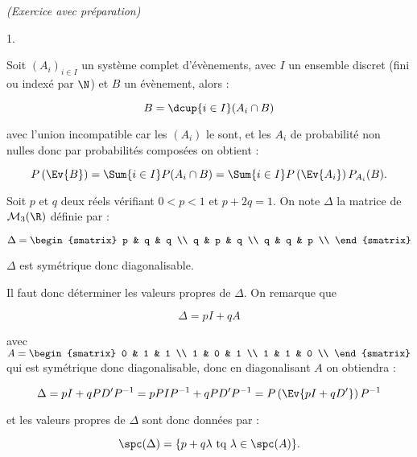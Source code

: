 \documentclass[11pt]{article}%
\begin{document}
 \begin{exercice}{\it (Exercice avec préparation)}~
 \begin{noliste}{1.}
 \setlength{\itemsep}{4mm}
 \item Soit $(A_{i})_{ i \in I }$ un système complet d'évènements, avec
$I$ un ensemble discret (fini ou indexé par $\N$) et $B$ un évènement,
alors : 
 
\[
 B = \dcup{ i \in I } ( A_{i} \cap B ) 
\]

 avec l'union incompatible car les $(A_{i})$ le sont, et les $A_{i}$ de
probabilité non nulles donc par probabilités composées on obtient : 
 
\[
 P \left(\Ev{ B }\right) = \Sum{i \in I} P ( A_{i} \cap B ) = \Sum{ i
\in I } P \left(\Ev{A_{i} }\right) P_{ A_{i} } ( B ). 
\]

 Soit $p$ et $q$ deux réels vérifiant $0<p<1$ et $p + 2q = 1$. On note
$\Delta$ la matrice de $\mathcal{M}_{3} ( \R )$ définie par :
 
\[
 \Delta = \begin{smatrix}
p & q & q \\
q & p & q \\
q & q & p \\
\end{smatrix}
\]

 \item $\Delta$ est symétrique donc diagonalisable. \\

 \item Il faut donc déterminer les valeurs propres de $\Delta$. On
remarque que
 
\[
 \Delta = p I + q A 
\]

 avec $A = \begin{smatrix}
0 & 1 & 1 \\
1 & 0 & 1 \\
1 & 1 & 0 \\
\end{smatrix}
$ qui est symétrique donc diagonalisable, donc en diagonalisant $A$ on
obtiendra : 
 
\[
 \Delta = p I + q P D' P^{-1} = p P I P^{-1} + q P D' P^{-1} = P
\left(\Ev{ p I + q D' }\right) P^{-1} 
\]

 et les valeurs propres de $\Delta$ sont donc données par : 
 
\[
 \spc ( \Delta ) = \{ p + q \lambda \text{ tq } \lambda \in \spc ( A )
\}. 
\]




\end{noliste}
\end{exercice}
\end{document}
